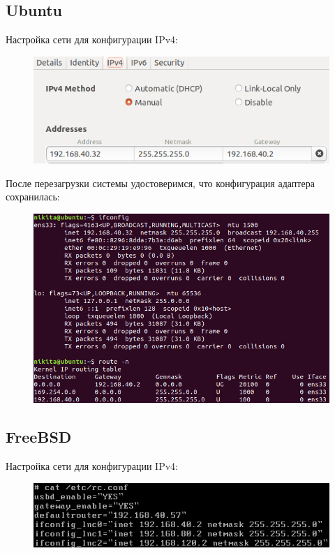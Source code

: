 \documentclass[14pt,a4paper,report]{report}
\begin{document}
\subsection{Ubuntu}

Настройка сети для конфигурации IPv4:

\begin{figure}[h!]
	\centering
	\includegraphics[scale = 0.95]{images/4_1.png}
	\caption{}
	\label{image:9}
\end{figure}

После перезагрузки системы удостоверимся, что конфигурация адаптера сохранилась:

\begin{figure}[h!]
	\centering
	\includegraphics[scale = 0.9]{images/4_2.png}
	\caption{}
	\label{image:10}
\end{figure}

\clearpage

\subsection{FreeBSD}

Настройка сети для конфигурации IPv4:

\begin{figure}[h!]
	\centering
	\includegraphics[scale = 1.15]{images/5_1.png}
	\caption{}
	\label{image:11}
\end{figure}
\end{document}
